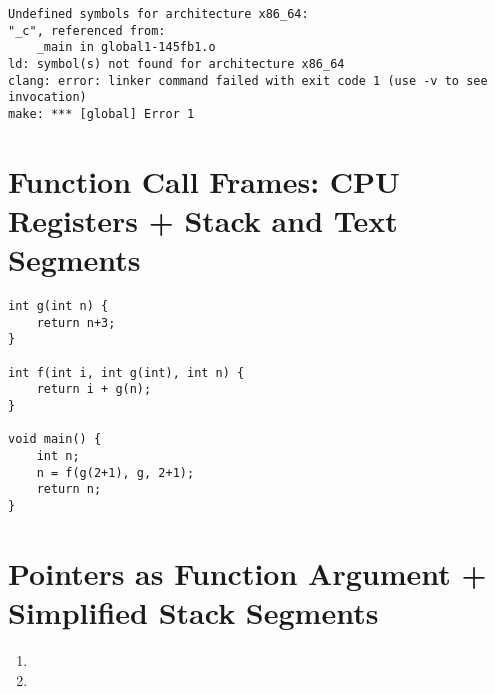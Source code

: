 \begin{lstlisting}[language={}]
Undefined symbols for architecture x86_64:
"_c", referenced from:
    _main in global1-145fb1.o
ld: symbol(s) not found for architecture x86_64
clang: error: linker command failed with exit code 1 (use -v to see invocation)
make: *** [global] Error 1
\end{lstlisting}




%
%
\section{Function Call Frames: CPU Registers + Stack and Text Segments}

\begin{lstlisting}
int g(int n) {
    return n+3;
}

int f(int i, int g(int), int n) {
    return i + g(n);
}

void main() {
    int n;
    n = f(g(2+1), g, 2+1);
    return n;
}
\end{lstlisting}



\todo{}





\todo{}


\todo{}


\todo{}


%
%
\section{Pointers as Function Argument + Simplified Stack Segments}


\begin{enumerate}[label={\questioncolor1.\arabic*.}]
    \item {}

    \todo{}

    \item {}

    \todo{}
\end{enumerate}

